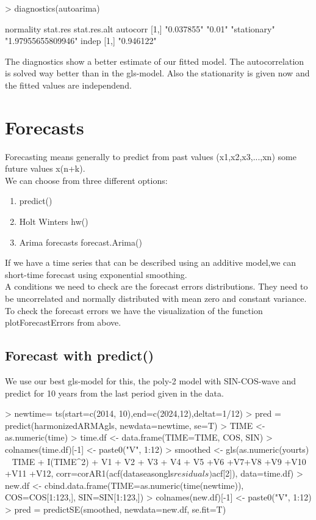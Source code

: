 \documentclass[11pt, a4paper]{article} %
\begin{document}
\begin{Schunk}
\begin{Sinput}
> diagnostics(autoarima)
\end{Sinput}
     normality  stat.res stat.res.alt autocorr          
[1,] "0.037855" "0.01"   "stationary" "1.97955655809946"
     indep     
[1,] "0.946122"\end{Schunk}

The diagnostics show a better estimate of our fitted model. 
The autocorrelation is solved way better than in the gls-model. Also the stationarity is given now and the fitted values are independend. 



\section{Forecasts}%
Forecasting means generally to predict from past values (x1,x2,x3,...,xn) some future values x(n+k). \\

We can choose from three different options: 
\begin{enumerate}
\item predict()
\item Holt Winters hw()
\item Arima forecasts forecast.Arima()
\end{enumerate}

If we have a time series that can be described using an additive model,we can short-time forecast using exponential smoothing.\\
A conditions we need to check are the forecast errors distributions. They need to be uncorrelated and normally distributed with mean zero and constant variance. To check the forecast errors we have the visualization of the function plotForecastErrors from above. 

\subsection{Forecast with predict()}
We use our best gls-model for this, the poly-2 model with SIN-COS-wave and predict for 10 years from the last period given in the data. 

\begin{Schunk}
\begin{Sinput}
> newtime= ts(start=c(2014, 10),end=c(2024,12),deltat=1/12)
> pred = predict(harmonizedARMAgls, newdata=newtime, se=T) 
> TIME <- as.numeric(time)
> time.df <- data.frame(TIME=TIME, COS, SIN)
> colnames(time.df)[-1] <- paste0("V", 1:12)
> smoothed <- gls(as.numeric(yourts) ~ TIME + I(TIME^2) + V1 + V2 + V3 + V4 + V5 
                 +V6 +V7+V8 +V9 +V10 +V11 +V12, 
                 corr=corAR1(acf(dataseasongls$residuals)$acf[2]),
                 data=time.df)
> new.df <- cbind.data.frame(TIME=as.numeric(time(newtime)), 
                            COS=COS[1:123,], SIN=SIN[1:123,])
> colnames(new.df)[-1] <- paste0("V", 1:12)
> pred = predictSE(smoothed, newdata=new.df, se.fit=T)
\end{Sinput}
\end{Schunk}
\end{document}
